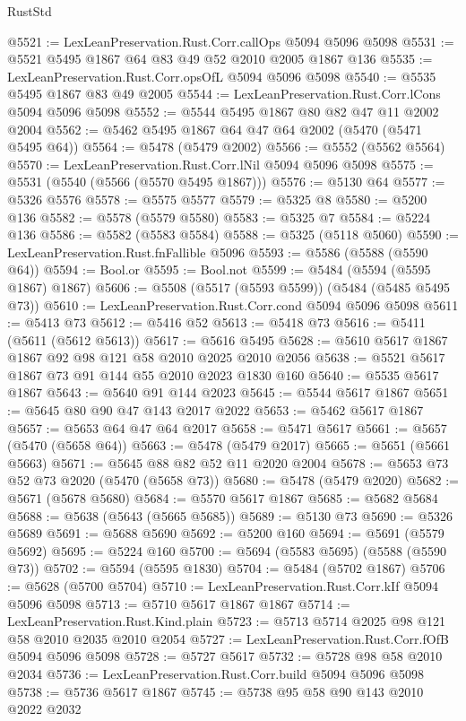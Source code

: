 \begin{lexlean}{RustStd}
\begin{coremodule}
@5521 := LexLeanPreservation.Rust.Corr.callOps @5094 @5096 @5098
@5531 := @5521 @5495 @1867 @64 @83 @49 @52 @2010 @2005 @1867 @136
@5535 := LexLeanPreservation.Rust.Corr.opsOfL @5094 @5096 @5098
@5540 := @5535 @5495 @1867 @83 @49 @2005
@5544 := LexLeanPreservation.Rust.Corr.lCons @5094 @5096 @5098
@5552 := @5544 @5495 @1867 @80 @82 @47 @11 @2002 @2004
@5562 := @5462 @5495 @1867 @64 @47 @64 @2002 (@5470 (@5471 @5495 @64))
@5564 := @5478 (@5479 @2002)
@5566 := @5552 (@5562 @5564)
@5570 := LexLeanPreservation.Rust.Corr.lNil @5094 @5096 @5098
@5575 := @5531 (@5540 (@5566 (@5570 @5495 @1867)))
@5576 := @5130 @64
@5577 := @5326 @5576
@5578 := @5575 @5577
@5579 := @5325 @8
@5580 := @5200 @136
@5582 := @5578 (@5579 @5580)
@5583 := @5325 @7
@5584 := @5224 @136
@5586 := @5582 (@5583 @5584)
@5588 := @5325 (@5118 @5060)
@5590 := LexLeanPreservation.Rust.fnFallible @5096
@5593 := @5586 (@5588 (@5590 @64))
@5594 := Bool.or
@5595 := Bool.not
@5599 := @5484 (@5594 (@5595 @1867) @1867)
@5606 := @5508 (@5517 (@5593 @5599)) (@5484 (@5485 @5495 @73))
@5610 := LexLeanPreservation.Rust.Corr.cond @5094 @5096 @5098
@5611 := @5413 @73
@5612 := @5416 @52
@5613 := @5418 @73
@5616 := @5411 (@5611 (@5612 @5613))
@5617 := @5616 @5495
@5628 := @5610 @5617 @1867 @1867 @92 @98 @121 @58 @2010 @2025 @2010 @2056
@5638 := @5521 @5617 @1867 @73 @91 @144 @55 @2010 @2023 @1830 @160
@5640 := @5535 @5617 @1867
@5643 := @5640 @91 @144 @2023
@5645 := @5544 @5617 @1867
@5651 := @5645 @80 @90 @47 @143 @2017 @2022
@5653 := @5462 @5617 @1867
@5657 := @5653 @64 @47 @64 @2017
@5658 := @5471 @5617
@5661 := @5657 (@5470 (@5658 @64))
@5663 := @5478 (@5479 @2017)
@5665 := @5651 (@5661 @5663)
@5671 := @5645 @88 @82 @52 @11 @2020 @2004
@5678 := @5653 @73 @52 @73 @2020 (@5470 (@5658 @73))
@5680 := @5478 (@5479 @2020)
@5682 := @5671 (@5678 @5680)
@5684 := @5570 @5617 @1867
@5685 := @5682 @5684
@5688 := @5638 (@5643 (@5665 @5685))
@5689 := @5130 @73
@5690 := @5326 @5689
@5691 := @5688 @5690
@5692 := @5200 @160
@5694 := @5691 (@5579 @5692)
@5695 := @5224 @160
@5700 := @5694 (@5583 @5695) (@5588 (@5590 @73))
@5702 := @5594 (@5595 @1830)
@5704 := @5484 (@5702 @1867)
@5706 := @5628 (@5700 @5704)
@5710 := LexLeanPreservation.Rust.Corr.kIf @5094 @5096 @5098
@5713 := @5710 @5617 @1867 @1867
@5714 := LexLeanPreservation.Rust.Kind.plain
@5723 := @5713 @5714 @2025 @98 @121 @58 @2010 @2035 @2010 @2054
@5727 := LexLeanPreservation.Rust.Corr.fOfB @5094 @5096 @5098
@5728 := @5727 @5617
@5732 := @5728 @98 @58 @2010 @2034
@5736 := LexLeanPreservation.Rust.Corr.build @5094 @5096 @5098
@5738 := @5736 @5617 @1867
@5745 := @5738 @95 @58 @90 @143 @2010 @2022 @2032

\end{coremodule}
\end{lexlean}
